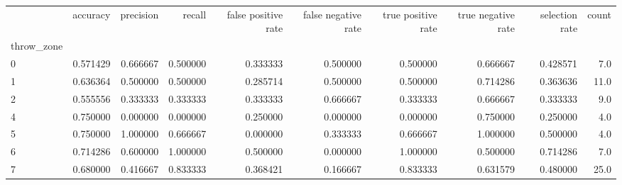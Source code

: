 \begin{tabular}{lrrrrrrrrr}
\toprule
{} &  accuracy &  precision &    recall &  false positive rate &  false negative rate &  true positive rate &  true negative rate &  selection rate &  count \\
throw\_zone &           &            &           &                      &                      &                     &                     &                 &        \\
\midrule
0          &  0.571429 &   0.666667 &  0.500000 &             0.333333 &             0.500000 &            0.500000 &            0.666667 &        0.428571 &    7.0 \\
1          &  0.636364 &   0.500000 &  0.500000 &             0.285714 &             0.500000 &            0.500000 &            0.714286 &        0.363636 &   11.0 \\
2          &  0.555556 &   0.333333 &  0.333333 &             0.333333 &             0.666667 &            0.333333 &            0.666667 &        0.333333 &    9.0 \\
4          &  0.750000 &   0.000000 &  0.000000 &             0.250000 &             0.000000 &            0.000000 &            0.750000 &        0.250000 &    4.0 \\
5          &  0.750000 &   1.000000 &  0.666667 &             0.000000 &             0.333333 &            0.666667 &            1.000000 &        0.500000 &    4.0 \\
6          &  0.714286 &   0.600000 &  1.000000 &             0.500000 &             0.000000 &            1.000000 &            0.500000 &        0.714286 &    7.0 \\
7          &  0.680000 &   0.416667 &  0.833333 &             0.368421 &             0.166667 &            0.833333 &            0.631579 &        0.480000 &   25.0 \\
\bottomrule
\end{tabular}
